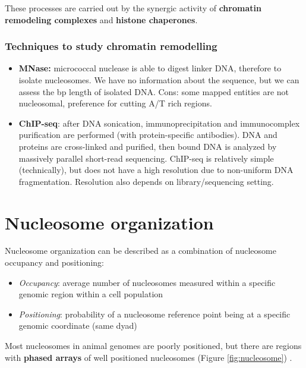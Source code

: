 These processes are carried out by the synergic activity of \textbf{chromatin remodeling complexes} and \textbf{histone chaperones}.

\hypertarget{techniques-to-study-chromatin-remodelling}{%
\subsubsection{Techniques to study chromatin remodelling}\label{techniques-to-study-chromatin-remodelling}}

\begin{itemize}
\tightlist
\item
  \textbf{MNase:} micrococcal nuclease is able to digest linker DNA, therefore to isolate nucleosomes. We have no information about the sequence, but we can assess the bp length of isolated DNA. Cons: some mapped entities are not nucleosomal, preference for cutting A/T rich regions.
\item
  \textbf{ChIP-seq}: after DNA sonication, immunoprecipitation and immunocomplex purification are performed (with protein-specific antibodies). DNA and proteins are cross-linked and purified, then bound DNA is analyzed by massively parallel short-read sequencing. ChIP-seq is relatively simple (technically), but does not have a high resolution due to non-uniform DNA fragmentation. Resolution also depends on library/sequencing setting.
\end{itemize}

\hypertarget{nucleosome-organization}{%
\section{Nucleosome organization}\label{nucleosome-organization}}

Nucleosome organization can be described as a combination of nucleosome occupancy and positioning:

\begin{itemize}
\tightlist
\item
  \emph{Occupancy}: average number of nucleosomes measured within a specific genomic region within a cell population
\item
  \emph{Positioning}: probability of a nucleosome reference point being at a specific genomic coordinate (same dyad)
\end{itemize}

Most nucleosomes in animal genomes are poorly positioned, but there are regions with \textbf{phased arrays} of well positioned nucleosomes (Figure \ref{fig:nucleosome}) .

